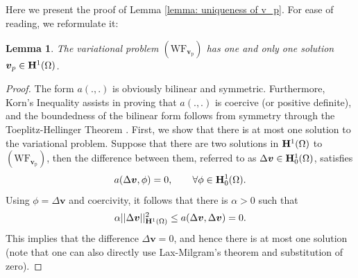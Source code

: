 \documentclass[pdflatex,sn-mathphys-num]{sn-jnl}
\newtheorem*{lemma star}{Lemma}
\begin{document}
\begin{appendices}

\section{}\label{Appendix}
Here we present the proof of Lemma \ref{lemma: uniqueness of v_p}. For ease of reading, we reformulate it:
\begin{lemma star}
    The variational problem $\mathrm{(WF_{{\boldsymbol v}_p})}$ has one and only one solution ${\boldsymbol v}_p \in {\bf H}^1(\Omega)$.
    \label{existence}
\end{lemma star}
\begin{proof}
The form $a(.,.)$ is obviously bilinear and symmetric. Furthermore, Korn's Inequality \citep{braess2001finite} assists in proving that $a(.,.)$ is coercive (or positive definite), and the boundedness of the bilinear form follows from symmetry through the Toeplitz-Hellinger Theorem \cite{Edward}. First, we show that there is at most one solution to the variational problem. Suppose that there are two solutions in ${\bf H}^1(\Omega)$ to $\mathrm{(WF_{{\boldsymbol v}_p})}$, then the difference between them, referred to as $\Delta {\boldsymbol v} \in {\bf H}^1_0(\Omega)$, satisfies
\begin{align*}
    a(\Delta {\boldsymbol v}, \phi) = 0, 
    \qquad \forall \phi \in {\bf H}^1_0(\Omega).
\end{align*}
Using $\phi = \Delta {\boldsymbol v}$ and coercivity, it follows that there is $\alpha > 0$ such that 
\begin{align}
\alpha || \Delta \boldsymbol{v} ||^2_{{\bf H}^1(\Omega)} \le a(\Delta {\boldsymbol v}, \Delta {\boldsymbol v}) = 0.
\end{align}
This implies that the difference $\Delta {\boldsymbol v} = 0$, and hence there is at most one solution (note that one can also directly use Lax-Milgram's theorem and substitution of zero).



\end{proof}
\end{appendices}
\end{document}
